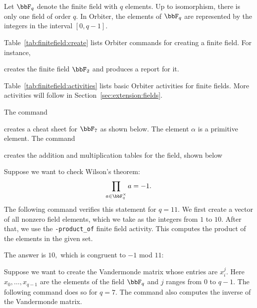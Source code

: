 Let $\bbF_q$ denote the finite field with $q$ elements. 
Up to isomorphism, there is only one field of order $q$. 
In Orbiter, the elements of $\bbF_q$ are represented 
by the integers in the interval $[0,q-1].$


\bigskip

Table~\ref{tab:finitefield:create} 
lists Orbiter commands for creating a finite field.
For instance,  


creates the finite field $\bbF_2$ and produces a report for it.

\bigskip


Table~\ref{tab:finitefield:activities} 
lists basic Orbiter activities for finite fields. 
More activities will follow in Section~\ref{sec:extension:fields}.  

The command  


creates a cheat sheet for $\bbF_7$ as shown below. 
The element $\alpha$ is a primitive element. 
The command  


creates the addition and multiplication tables for the field, 
shown below


\bigskip


Suppose we want to check Wilson's theorem:
$$
\prod_{a \in \bbF_q^\times} a = -1.
$$
The following command verifies this statement for $q = 11.$ 
We first create a vector of all 
nonzero field elements, 
which we take as the integers from $1$ to $10$. After that, 
we use the \verb'-product_of' finite field activity.
This computes the product of the elements in the given set. 


The answer is $10,$ which is congruent to $-1$ mod $11:$


\bigskip


Suppose we want to create the Vandermonde 
matrix whose entries are $x_{i}^j$. 
Here $x_0,\ldots,x_{q-1}$ are the elements of the field $\bbF_q$ 
and $j$ ranges from $0$ to $q-1$. 
The following command does so for $q=7$. 
The command also computes the inverse of the Vandermonde matrix.


